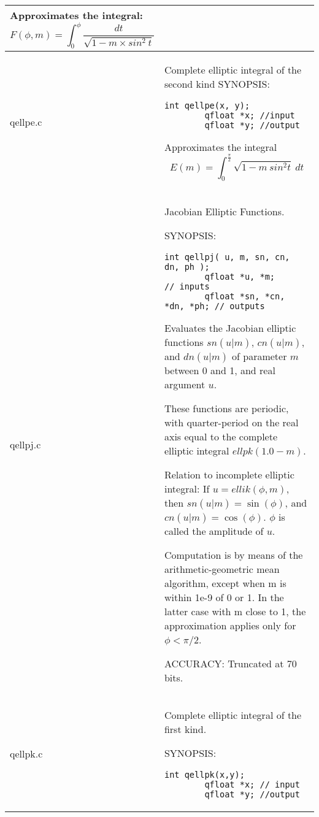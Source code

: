 \documentclass[10pt,a4paper,x11names]{memoir} %
\begin{document}
\begin{longtable}{|p{1.5cm}|p{11.5cm}|}
	 Approximates the integral:
	$$ F(\phi , m) = \int_{0}^{\phi} \frac{dt}{\sqrt{1-m\times sin^2 \ t}}$$
	\\\hline
	qellpe.c & Complete elliptic integral of the second kind
	{\footnotesize SYNOPSIS:}\vspace{-0.2cm}\index{qellpe}
	\begin{lstlisting}[numbers=none]
		int qellpe(x, y);
		qfloat *x; //input
		qfloat *y; //output
	\end{lstlisting}\vspace{-0.2cm}
	Approximates the integral
	$$ E(m) = \int_{0}^{\frac{\pi}{2}} \sqrt{1 - m\ sin^2 t} \ dt$$
	\\\hline
	qellpj.c& Jacobian Elliptic Functions.
	
	{\footnotesize SYNOPSIS:}\vspace{-0.2cm}\index{qellpi}
	\begin{lstlisting}[numbers=none]
		int qellpj( u, m, sn, cn, dn, ph );
		qfloat *u, *m;             // inputs
		qfloat *sn, *cn, *dn, *ph; // outputs
	\end{lstlisting}\vspace{-0.2cm}
	
	
	Evaluates the Jacobian elliptic functions $sn(u|m)$, $cn(u|m)$,
	and $dn(u|m)$ of parameter $m$ between 0 and 1, and real
	argument $u$.
	
	These functions are periodic, with quarter-period on the
	real axis equal to the complete elliptic integral
	$ellpk(1.0-m)$.
	
	Relation to incomplete elliptic integral:
	If $u = ellik(\phi,m)$, then $sn(u|m) = \sin(\phi)$,
	and $cn(u|m) = \cos(\phi)$.  $\phi$ is called the amplitude of $u$.
	
	Computation is by means of the arithmetic-geometric mean
	algorithm, except when m is within 1e-9 of 0 or 1.  In the
	latter case with m close to 1, the approximation applies
	only for $\phi < \pi/2$.
	
	{\footnotesize{ACCURACY:}}  Truncated at 70 bits.
	\\\hline
	qellpk.c& Complete elliptic integral of the first kind.
	
	{\footnotesize SYNOPSIS:}\vspace{-0.2cm}\index{qellpk}
	\begin{lstlisting}[numbers=none]
		int qellpk(x,y);
		qfloat *x; // input
		qfloat *y; //output
	\end{lstlisting}\vspace{-0.2cm}
	

\end{longtable}
\end{document}
